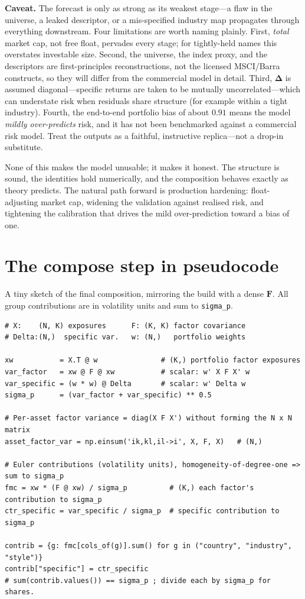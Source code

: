 \documentclass[11pt]{article}
\theoremstyle{definition}
\theoremstyle{plain}
\theoremstyle{remark}
\newcommand{\Fmat}{\mathbf{F}}
\newcommand{\Del}{\boldsymbol{\Delta}}
\begin{document}
\begin{pitfall}
\textbf{Caveat.} The forecast is only as strong as its weakest stage---a flaw in the universe, a leaked descriptor, or a mis-specified industry map propagates through everything downstream. Four limitations are worth naming plainly. First, \emph{total} market cap, not free float, pervades every stage; for tightly-held names this overstates investable size. Second, the universe, the index proxy, and the descriptors are first-principles reconstructions, not the licensed MSCI/Barra constructs, so they will differ from the commercial model in detail. Third, $\Del$ is assumed diagonal---specific returns are taken to be mutually uncorrelated---which can understate risk when residuals share structure (for example within a tight industry). Fourth, the end-to-end portfolio bias of about $0.91$ means the model \emph{mildly over-predicts} risk, and it has not been benchmarked against a commercial risk model. Treat the outputs as a faithful, instructive replica---not a drop-in substitute.
\end{pitfall}

None of this makes the model unusable; it makes it honest. The structure is sound, the identities hold numerically, and the composition behaves exactly as theory predicts. The natural path forward is production hardening: float-adjusting market cap, widening the validation against realised risk, and tightening the calibration that drives the mild over-prediction toward a bias of one.

\appendix
\section{The compose step in pseudocode}

A tiny sketch of the final composition, mirroring the build with a dense $\Fmat$. All group contributions are in volatility units and sum to \texttt{sigma\_p}.

{\footnotesize
\begin{verbatim}
# X:    (N, K) exposures      F: (K, K) factor covariance
# Delta:(N,)  specific var.   w: (N,)   portfolio weights

xw           = X.T @ w               # (K,) portfolio factor exposures
var_factor   = xw @ F @ xw           # scalar: w' X F X' w
var_specific = (w * w) @ Delta       # scalar: w' Delta w
sigma_p      = (var_factor + var_specific) ** 0.5

# Per-asset factor variance = diag(X F X') without forming the N x N matrix
asset_factor_var = np.einsum('ik,kl,il->i', X, F, X)   # (N,)

# Euler contributions (volatility units), homogeneity-of-degree-one => sum to sigma_p
fmc = xw * (F @ xw) / sigma_p          # (K,) each factor's contribution to sigma_p
ctr_specific = var_specific / sigma_p  # specific contribution to sigma_p

contrib = {g: fmc[cols_of(g)].sum() for g in ("country", "industry", "style")}
contrib["specific"] = ctr_specific
# sum(contrib.values()) == sigma_p ; divide each by sigma_p for shares.
\end{verbatim}
}
\end{document}
